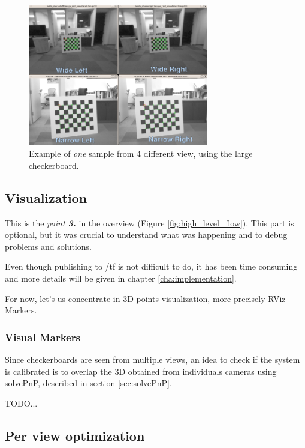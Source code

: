 \begin{figure}[!htbp]
 \centering
 \includegraphics[width=0.7\textwidth]{images/data_collection01.png}
 \caption{Example of \textit{one} sample from 4 different view, using the large checkerboard.}
 \label{fig:data_collection01}
\end{figure}




\subsection{Visualization}

This is the \textit{point \textbf{3.}} in the overview (Figure \ref{fig:high_level_flow}). This part is optional, but it was crucial to understand what was happening and to debug problems and solutions.

Even though publishing to /tf is not difficult to do, it has been time consuming and more details will be given in chapter \ref{cha:implementation}. %

For now, let's us concentrate in 3D points visualization, more precisely RViz Markers.

\subsubsection{Visual Markers}

Since checkerboards are seen from multiple views, an idea to check if the system is calibrated is to overlap the 3D obtained from individuals cameras using solvePnP, described in section \ref{sec:solvePnP}.

TODO...


\subsection{Per view optimization}

